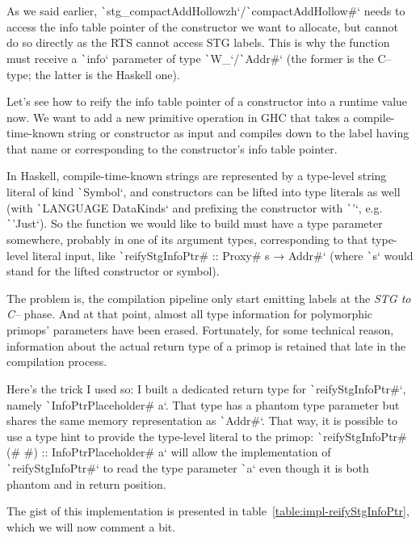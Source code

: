 \documentclass[english]{jflart}
\begin{document}
As we said earlier, \texttt`stg_compactAddHollowzh`/\texttt`compactAddHollow#` needs to access the info table pointer of the constructor we want to allocate, but cannot do so directly as the RTS cannot access STG labels. This is why the function must receive a \texttt`info` parameter of type \texttt`W_`/\texttt`Addr#` (the former is the C-- type; the latter is the Haskell one).

Let's see how to reify the info table pointer of a constructor into a runtime value now. We want to add a new primitive operation in GHC that takes a compile-time-known string or constructor as input and compiles down to the label having that name or corresponding to the constructor's info table pointer.

In Haskell, compile-time-known strings are represented by a type-level string literal of kind \texttt`Symbol`, and constructors can be lifted into type literals as well (with \texttt`LANGUAGE DataKinds` and prefixing the constructor with \texttt`'`, e.g. \texttt`'Just`). So the function we would like to build must have a type parameter somewhere, probably in one of its argument types, corresponding to that type-level literal input, like \texttt`reifyStgInfoPtr# :: Proxy# s → Addr#` (where \texttt`s` would stand for the lifted constructor or symbol).

The problem is, the compilation pipeline only start emitting labels at the \emph{STG to C--} phase. And at that point, almost all type information for polymorphic primops' parameters have been erased. Fortunately, for some technical reason, information about the actual return type of a primop is retained that late in the compilation process.

Here's the trick I used so: I built a dedicated return type for \texttt`reifyStgInfoPtr#`, namely \texttt`InfoPtrPlaceholder# a`. That type has a phantom type parameter but shares the same memory representation as \texttt`Addr#`. That way, it is possible to use a type hint to provide the type-level literal to the primop: \texttt`reifyStgInfoPtr# (# #) :: InfoPtrPlaceholder# a` will allow the implementation of \texttt`reifyStgInfoPtr#` to read the type parameter \texttt`a` even though it is both phantom and in return position.

The gist of this implementation is presented in table~\ref{table:impl-reifyStgInfoPtr}, which we will now comment a bit.
\end{document}
